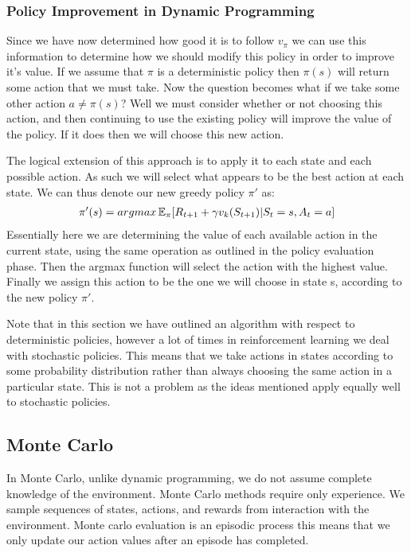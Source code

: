 \subsubsection{Policy Improvement in Dynamic Programming}
Since we have now determined how good it is to follow $v_\pi$ we can use this information to determine how
we should modify this policy in order to improve it's value.
If we assume that $\pi$ is a deterministic policy then $\pi(s)$ will return some action that we must take.
Now the question becomes what if we take some other action $a \neq \pi(s)$?
Well we must consider whether or not choosing this action, and then continuing to use the existing policy will
improve the value of the policy.
If it does then we will choose this new action.

The logical extension of this approach is to apply it to each state and each possible action.
As such we will select what appears to be the best action at each state.
We can thus denote our new greedy policy $\pi'$ as:
\begin{align}
    \pi'(s) = argmax\operatorname{\mathbb{E}}_{\pi}\lbrack R_{t+1} + \gamma v_k(S_{t+1}) | S_t = s, A_t = a\rbrack
\end{align}
Essentially here we are determining the value of each available action in the current state, using the same operation
as outlined in the policy evaluation phase.
Then the argmax function will select the action with the highest value.
Finally we assign this action to be the one we will choose in state s, according to the new policy $\pi'$.

Note that in this section we have outlined an algorithm with respect to deterministic policies,
however a lot of times in reinforcement learning we deal with stochastic policies.
This means that we take actions in states according to some probability distribution rather than always choosing
the same action in a particular state.
This is not a problem as the ideas mentioned apply equally well to stochastic policies.

\subsection{Monte Carlo}\label{subsec:mc}
In Monte Carlo, unlike dynamic programming, we do not assume complete knowledge of the environment.
Monte Carlo methods require only experience.
We sample sequences of states, actions, and rewards from interaction with the
environment\citep{sutton1998reinforcement}.
Monte carlo evaluation is an episodic process this means that we only update our action values after an episode
has completed.

